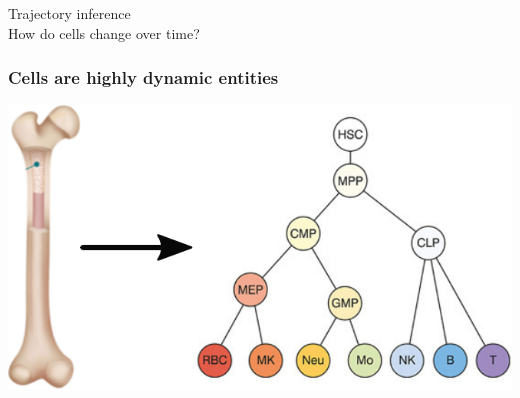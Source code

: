 \documentclass[usepdftitle=false, compress]{beamer}
\begin{document}

\begin{frame}
	\vfill
	\begin{center}
		\color{set1blue}
		{\LARGE Trajectory inference} \\
		How do cells change over time?
	\end{center}
	\vfill
\end{frame}

\begin{frame}
	\frametitle{Cells are highly dynamic entities}
	\begin{center}
		\includegraphics[width=.6\linewidth]{figures/3_dynamiccells.pdf}
	\end{center}
\end{frame}
\end{document}
